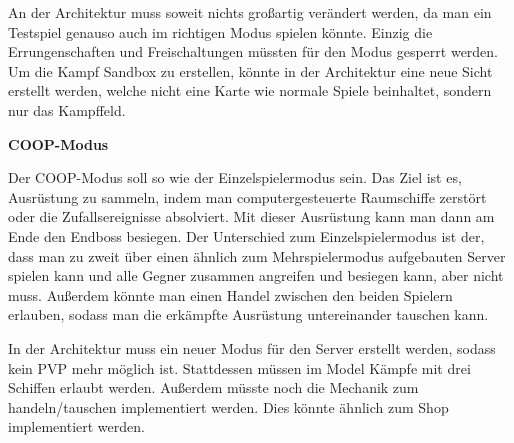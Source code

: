 \documentclass[fontsize=12pt,paper=a4,twoside]{scrartcl}
\begin{document}
{An der Architektur muss soweit nichts großartig verändert werden, da man ein Testspiel genauso auch im richtigen Modus spielen könnte. Einzig die Errungenschaften und Freischaltungen müssten für den Modus gesperrt werden. Um die Kampf Sandbox zu erstellen, könnte in der Architektur eine neue Sicht erstellt werden, welche nicht eine Karte wie normale Spiele beinhaltet, sondern nur das Kampffeld. 

}

\textbf{COOP-Modus}
{
Der COOP-Modus soll so wie der Einzelspielermodus sein. Das Ziel ist es, Ausrüstung zu sammeln, indem man computergesteuerte Raumschiffe zerstört oder die Zufallsereignisse absolviert. Mit dieser Ausrüstung kann man dann am Ende den Endboss besiegen. Der Unterschied zum Einzelspielermodus ist der, dass man zu zweit über einen ähnlich zum Mehrspielermodus aufgebauten Server spielen kann und alle Gegner zusammen angreifen und besiegen kann, aber nicht muss. Außerdem könnte man einen Handel zwischen den beiden Spielern erlauben, sodass man die erkämpfte Ausrüstung untereinander tauschen kann.

In der Architektur muss ein neuer Modus für den Server erstellt werden, sodass kein PVP mehr möglich ist. Stattdessen müssen im Model Kämpfe mit drei Schiffen erlaubt werden. Außerdem müsste noch die Mechanik zum handeln/tauschen implementiert werden. Dies könnte ähnlich zum Shop implementiert werden.
}
\end{document}
